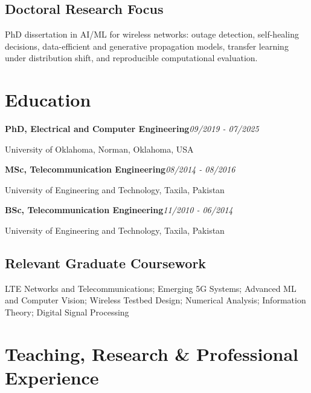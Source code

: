 \documentclass[9pt,letterpaper]{extarticle}
\newcommand{\entry}[2]{\Needspace{4\baselineskip}\textbf{#1}\hfill\textit{#2}\par}
\begin{document}
\subsection{Doctoral Research Focus}
PhD dissertation in AI/ML for wireless networks: outage detection, self-healing decisions, data-efficient and generative propagation models, transfer learning under distribution shift, and reproducible computational evaluation.\par
{}
\section{Education}
\entry{PhD, Electrical and Computer Engineering}{09/2019 - 07/2025}
University of Oklahoma, Norman, Oklahoma, USA\par
\entry{MSc, Telecommunication Engineering}{08/2014 - 08/2016}
University of Engineering and Technology, Taxila, Pakistan\par
\entry{BSc, Telecommunication Engineering}{11/2010 - 06/2014}
University of Engineering and Technology, Taxila, Pakistan\par
{}
\subsection{Relevant Graduate Coursework}
LTE Networks and Telecommunications; Emerging 5G Systems; Advanced ML and Computer Vision; Wireless Testbed Design; Numerical Analysis; Information Theory; Digital Signal Processing\par
{}
\section{Teaching, Research \& Professional Experience}
\end{document}
